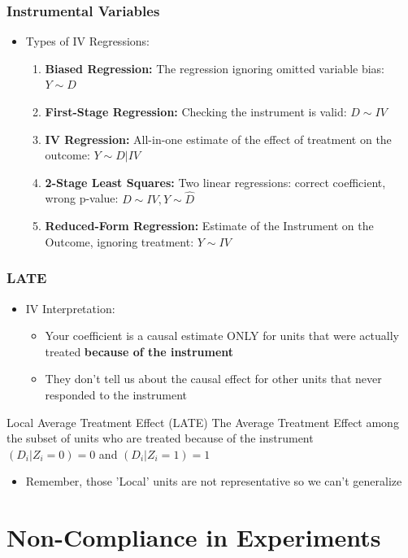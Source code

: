 \documentclass[xcolor=x11names,compress]{beamer}\usepackage[]{graphicx}\usepackage[]{color}
\renewcommand{\(}{\begin{columns}}
\renewcommand{\)}{\end{columns}}
\newcommand{\<}[1]{\begin{column}{#1}}
\renewcommand{\>}{\end{column}}
\begin{document}
\begin{frame}
\frametitle{Instrumental Variables}
\begin{itemize}
\item Types of IV Regressions:
\pause
\begin{enumerate}
\item \textbf{Biased Regression:} The regression ignoring omitted variable bias: $Y \sim D$
\pause
\item \textbf{First-Stage Regression:} Checking the instrument is valid: $D \sim IV$
\pause
\item \textbf{IV Regression:} All-in-one estimate of the effect of treatment on the outcome: $Y \sim D | IV$
\pause
\item \textbf{2-Stage Least Squares:} Two linear regressions: correct coefficient, wrong p-value: $D \sim IV, Y \sim \hat{D}$
\pause
\item \textbf{Reduced-Form Regression:} Estimate of the Instrument on the Outcome, ignoring treatment: $Y \sim IV$
\end{enumerate}
\end{itemize}
\end{frame}

\begin{frame}
\frametitle{LATE}
\begin{itemize}
\item IV Interpretation:
\pause
\begin{itemize}
\item Your coefficient is a causal estimate ONLY for units that were actually treated \textbf{because of the instrument}
\pause
\item They don't tell us about the causal effect for other units that never responded to the instrument
\end{itemize}
\end{itemize}
\pause
\begin{block}{Local Average Treatment Effect (LATE)}
The Average Treatment Effect among the subset of units who are treated because of the instrument \\
$(D_i|Z_i=0) = 0$ and $(D_i|Z_i=1) = 1$
\end{block}
\begin{itemize}
\item Remember, those 'Local' units are not representative so we can't generalize
\end{itemize}
\end{frame}

\section{Non-Compliance in Experiments}
\end{document}
